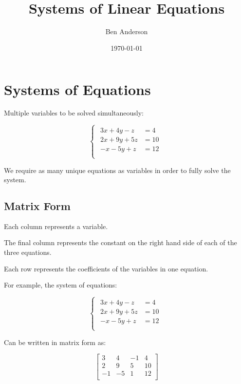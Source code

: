 \documentclass[a4paper,11pt]{article}
\begin{document}
\title{Systems of Linear Equations}
\author{Ben Anderson}
\date{\today}
\maketitle
\pagebreak

\tableofcontents
\pagebreak


\section{Systems of Equations}

Multiple variables to be solved simultaneously:

$$
\begin{cases}
\begin{aligned}
3x + 4y - z & = 4 \\
2x + 9y + 5z & = 10 \\
-x - 5y + z & = 12 \\
\end{aligned}
\end{cases}
$$

We require as many unique equations as variables in order to fully solve the
system.


\subsection{Matrix Form}

Each column represents a variable.

The final column represents the constant on the right hand side of each of the
three equations.

Each row represents the coefficients of the variables in one equation.

For example, the system of equations:

$$
\begin{cases}
\begin{aligned}
 3x + 4y - z & = 4  \\
2x + 9y + 5z & = 10 \\
 -x - 5y + z & = 12 \\
\end{aligned}
\end{cases}
$$

Can be written in matrix form as:

$$
\begin{bmatrix}
 3 &  4 & -1 & 4  \\
 2 &  9 &  5 & 10 \\
-1 & -5 &  1 & 12 \\
\end{bmatrix}
$$
\end{document}
